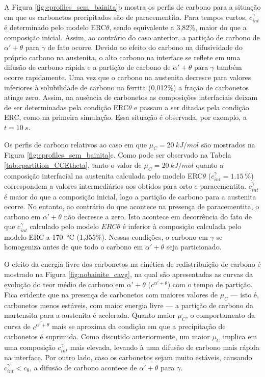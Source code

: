 A Figura \ref{fig:cprofiles_sem_bainita}b mostra os perfis de carbono para a situação em que os carbonetos precipitados são de paracementita. Para tempos curtos, $c^\gamma_{int}$ é determinado pelo modelo ERC$\theta$, sendo equivalente a 3,82\%, maior do que a composição inicial. Assim, ao contrário do caso anterior, a partição de carbono de $\alpha' + \theta$ para $\gamma$ de fato ocorre. Devido ao efeito do carbono na difusividade do próprio carbono na austenita, o alto carbono na interface se reflete em uma difusão de carbono rápida e a partição de carbono de $\alpha' + \theta$ para $\gamma$ também ocorre rapidamente. Uma vez que o carbono na austenita decresce para valores inferiores à solubilidade de carbono na ferrita (0,012\%) a fração de carbonetos atinge zero. Assim, na ausência de carbonetos as composições interfaciais deixam de ser determinadas pela condição ERC$\theta$ e passam a ser ditadas pela condição ERC, como na primeira simulação. Essa situação é observada, por exemplo, a $t=\SI{10}{s}$.

Os perfis de carbono relativos ao caso em que $\mu_C = \SI{20}{kJ/mol}$ são mostrados na Figura \ref{fig:cprofiles_sem_bainita}c. Como pode ser observado na Tabela \ref{tab:cpartition_CCEtheta}, tanto o valor de $\mu_C = \SI{20}{kJ/mol}$ quanto a composição interfacial na austenita calculada pelo modelo ERC$\theta$ ($c^\gamma_{int} = \SI{1.15}{\%}$) correspondem a valores intermediários aos obtidos para orto e paracementita. $c^\gamma_{int}$ é maior do que a composição inicial, logo a partição de carbono para a austenita ocorre. No entanto, ao contrário do que acontece na presença de paracementita, o carbono em $\alpha' + \theta$ não decresce a zero. Isto acontece em decorrência do fato de que $c^\gamma_{int}$ calculado pelo modelo $ERC\theta$ é inferior à composição calculada pelo modelo ERC a \SI{170}{\degreeCelsius} (1,355\%). Nessas condições, o carbono em $\gamma$ se homogeniza antes de que todo o carbono em $\alpha' + \theta$ seja particionado. 

O efeito da energia livre dos carbonetos na cinética de redistribuição de carbono é mostrado na Figura \ref{fig:nobainite_cavg}, na qual são apresentadas as curvas da evolução do teor médio de carbono em $\alpha' + \theta$ ($\overline{c^{\alpha' + \theta}}$) com o tempo de partição. Fica evidente que na presença de carbonetos com maiores valores de $\mu_C$ --- isto é, carbonetos menos estáveis, com maior energia livre --- a partição de carbono da martensita para a austenita é acelerada. Quanto maior $\mu_C$, o comportamento da curva de $\overline{c^{\alpha' + \theta}}$ mais se aproxima da condição em que a precipitação de carbonetos é suprimida.
Como discutido anteriormente, um maior $\mu_C$ implica em uma composição $c^\gamma_{int}$ mais elevada, levando à uma difusão de carbono mais rápida na interface.
Por outro lado, caso os carbonetos sejam muito estáveis, causando $c^\gamma_{int} < c_0$, a difusão de carbono acontece de $\alpha' + \theta$ para $\gamma$.

